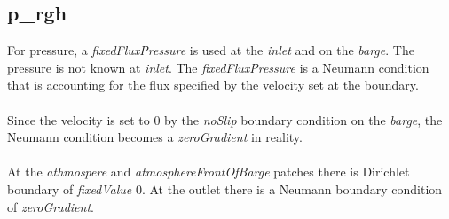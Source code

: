 \documentclass[a4paper, 12pt]{report}
\begin{document}
\subsection{p\_rgh}
For pressure, a \textit{fixedFluxPressure} is used at the \textit{inlet} and on the \textit{barge}. The pressure is not known at \textit{inlet}. The \textit{fixedFluxPressure} is a Neumann condition that is accounting for the flux specified by the velocity set at the boundary.\\
\\
Since the velocity is set to 0 by the \textit{noSlip} boundary condition on the \textit{barge}, the Neumann condition becomes a \textit{zeroGradient} in reality.\\
\\
At the \textit{athmospere} and \textit{atmosphereFrontOfBarge} patches there is Dirichlet boundary of \textit{fixedValue} 0. At the outlet there is a Neumann boundary condition of \textit{zeroGradient}. 
\end{document}
